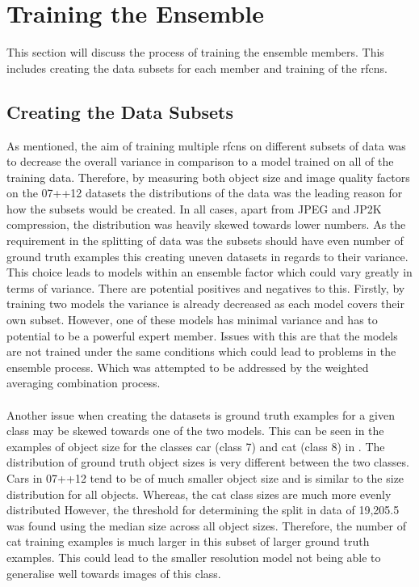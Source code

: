 \section{Training the Ensemble}
This section will discuss the process of training the ensemble members. This includes creating the data subsets for each member and training of the \glspl{rfcn}.

\subsection{Creating the Data Subsets}
As mentioned, the aim of training multiple \glspl{rfcn} on different subsets of data was to decrease the overall variance in comparison to a model trained on all of the training data. Therefore, by measuring both object size and image quality factors on the 07++12 datasets the distributions of the data was the leading reason for how the subsets would be created. In all cases, apart from JPEG and JP2K compression, the distribution was heavily skewed towards lower numbers. As the requirement in the splitting of data was the subsets should have even number of ground truth examples this creating uneven datasets in regards to their variance. This choice leads to models within an ensemble factor which could vary greatly in terms of variance. There are potential positives and negatives to this. Firstly, by training two models the variance is already decreased as each model covers their own subset. However, one of these models has minimal variance and has to potential to be a powerful expert member. Issues with this are that the models are not trained under the same conditions which could lead to problems in the ensemble process. Which was attempted to be addressed by the weighted averaging combination process.
\\\\
Another issue when creating the datasets is ground truth examples for a given class may be skewed towards one of the two models. This can be seen in the examples of object size for the classes car (class 7) and cat (class 8) in . The distribution of ground truth object sizes is very different between the two classes. Cars in 07++12 tend to be of much smaller object size and is similar to the size distribution for all objects. Whereas, the cat class sizes are much more evenly distributed  However, the threshold for determining the split in data of 19,205.5 was found using the median size across all object sizes. Therefore, the number of cat training examples is much larger in this subset of larger ground truth examples. This could lead to the smaller resolution model not being able to generalise well towards images of this class.


